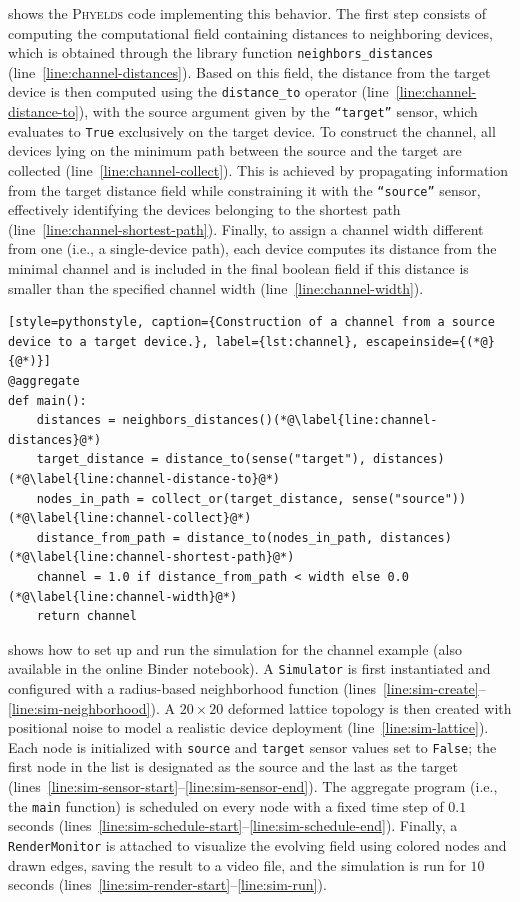 \documentclass[runningheads]{llncs}
\begin{document}
 shows the \textsc{Phyelds} code implementing this behavior. 
%
The first step consists of computing the computational field containing distances to neighboring devices, 
 which is obtained through the library function \texttt{neighbors\_distances} (line~\ref{line:channel-distances}). 
% 
Based on this field, 
 the distance from the target device is then computed using the \texttt{distance\_to} operator (line~\ref{line:channel-distance-to}), 
  with the source argument given by the \texttt{``target''} sensor,
   which evaluates to \texttt{True} exclusively on the target device.
%
To construct the channel, 
 all devices lying on the minimum path between the source and the target are collected (line~\ref{line:channel-collect}). 
% 
This is achieved by propagating information from the target distance field while constraining it with the \texttt{``source''} sensor, 
 effectively identifying the devices belonging to the shortest path (line~\ref{line:channel-shortest-path}). 
%
Finally, 
 to assign a channel width different from one (i.e., a single-device path), 
 each device computes its distance from the minimal channel and is included 
 in the final boolean field if this distance is smaller than the specified channel width (line~\ref{line:channel-width}).


\begin{lstlisting}[style=pythonstyle, caption={Construction of a channel from a source device to a target device.}, label={lst:channel}, escapeinside={(*@}{@*)}]
@aggregate
def main():
    distances = neighbors_distances()(*@\label{line:channel-distances}@*)
    target_distance = distance_to(sense("target"), distances)(*@\label{line:channel-distance-to}@*)
    nodes_in_path = collect_or(target_distance, sense("source"))(*@\label{line:channel-collect}@*)
    distance_from_path = distance_to(nodes_in_path, distances)(*@\label{line:channel-shortest-path}@*)
    channel = 1.0 if distance_from_path < width else 0.0 (*@\label{line:channel-width}@*)
    return channel 
\end{lstlisting}

 shows how to set up and run the simulation for the channel example 
 (also available in the online Binder notebook).
%
A \texttt{Simulator} is first instantiated and configured with a radius-based neighborhood function (lines~\ref{line:sim-create}--\ref{line:sim-neighborhood}). 
%
A $20 \times 20$ deformed lattice topology is then created with positional noise to model a realistic device deployment (line~\ref{line:sim-lattice}). 
%
Each node is initialized with \texttt{source} and \texttt{target} sensor values set to \texttt{False}; 
 the first node in the list is designated as the source and the last as the target (lines~\ref{line:sim-sensor-start}--\ref{line:sim-sensor-end}). 
%
The aggregate program (i.e., the \texttt{main} function) is scheduled on every node with a fixed time step of $0.1$ seconds (lines~\ref{line:sim-schedule-start}--\ref{line:sim-schedule-end}). 
%
Finally, a \texttt{RenderMonitor} is attached to visualize the evolving field using colored nodes and drawn edges, 
 saving the result to a video file, and the simulation is run for $10$ seconds (lines~\ref{line:sim-render-start}--\ref{line:sim-run}).
\end{document}
